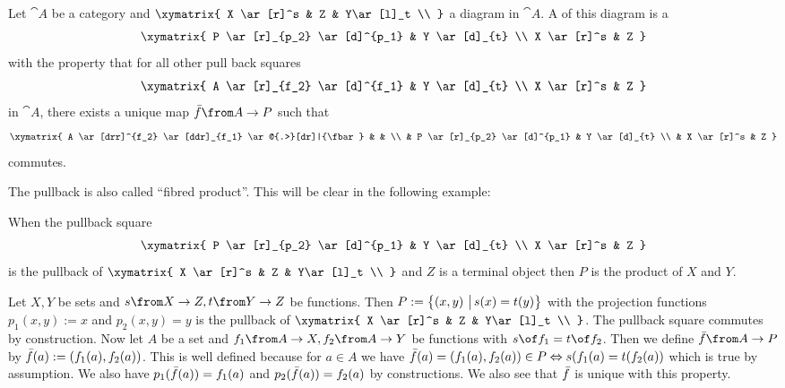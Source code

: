 \begin{definition}[Pullback]
  \label{def:pullback}
  Let $\cat{A}$ be a category and
  $ \xymatrix{
    X \ar[r]^s & Z & Y\ar[l]_t \\
  } $
  a diagram in $\cat{A}$.
  A  of this diagram is a 
  \[ \xymatrix{
    P \ar[r]_{p_2} \ar[d]^{p_1} & Y \ar[d]_{t} \\
    X \ar[r]^s & Z
  } \]
  with the property that for all other pull back squares
  \[ \xymatrix{
    A \ar[r]_{f_2} \ar[d]^{f_1} & Y \ar[d]_{t} \\
    X \ar[r]^s & Z
  } \]
  in $\cat{A}$, there exists a unique map $\fbar\from A \to P$ such that
  \[ \xymatrix{
    A \ar[drr]^{f_2} \ar[ddr]_{f_1} \ar@{.>}[dr]|{\fbar} & & \\
    & P \ar[r]_{p_2} \ar[d]^{p_1} & Y \ar[d]_{t} \\
    & X \ar[r]^s & Z
  } \]
  commutes.
\end{definition}

The pullback is also called ``fibred product''. This will be clear in the following example:

\begin{example}
  When the pullback square
  \[ \xymatrix{
    P \ar[r]_{p_2} \ar[d]^{p_1} & Y \ar[d]_{t} \\
    X \ar[r]^s & Z
  } \]
  is the pullback of
  $ \xymatrix{
    X \ar[r]^s & Z & Y\ar[l]_t \\
  } $
  and $Z$ is a terminal object then $P$ is the product of $X$ and $Y$.
\end{example}

\begin{example}
  Let $X, Y$ be sets and $s \from X \to Z, t \from Y \to Z$ be functions.
  Then $P := \bigl \{ \left( x , y \right) \,\big|\, s(x) = t(y) \bigr \}$ with the projection functions
  $p_1(x,y) := x$ and $p_2(x, y) = y$ is the pullback of
  $ \xymatrix{
    X \ar[r]^s & Z & Y\ar[l]_t \\
  } $.
  The pullback square commutes by construction.
  Now let $A$ be a set and $f_1 \from A \to X, f_2 \from A \to Y$ be functions with $s \of f_1 = t \of f_2$.
  Then we define $\fbar \from A \to P$ by
  $\bar{f}(a) := \left( f_1(a) , f_2(a) \right)$.
  This is well defined because for $a \in A$ we have $\bar{f}(a) = \left( f_1(a) , f_2(a) \right) \in P \Leftrightarrow s(f_1(a) = t(f_2(a))$ which is true by assumption.
  We also have $p_1(\bar{f}(a)) = f_1(a)$ and $p_2(\bar{f}(a)) = f_2(a)$ by constructions.
  We also see that $\bar{f}$ is unique with this property.
\end{example}

